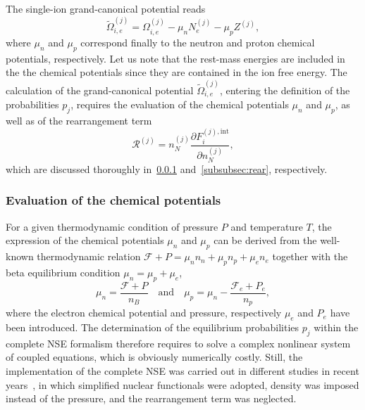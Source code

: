 %
The single-ion grand-canonical potential reads
%
\begin{equation}
  \tilde{\Omega}_{i,e}^{(j)} = \Omega_{i,e}^{(j)} - \mu_n N_e^{(j)} -
  \mu_p Z^{(j)},
\end{equation}
%
where $\mu_n$ and $\mu_p$ correspond finally to the neutron and proton 
chemical potentials, respectively. Let us note that the rest-mass energies are 
included in the the chemical potentials since they are contained in the ion 
free energy. 
The calculation of the grand-canonical potential $\tilde{\Omega}_{i,e}^{(j)}$, 
entering the definition of the probabilities $p_j$, requires the 
evaluation of the chemical potentials $\mu_n$ and $\mu_p$, as well as of the 
rearrangement term
%
\begin{equation}
  \mathcal{R}^{(j)} = n_N^{(j)} 
  \frac{\partial F_i^{(j),\text{int}}}{\partial n_N^{(j)}},
\end{equation}
%
which are discussed thoroughly in~\ref{subsubsec:chempoteval}
and~\ref{subsubsec:rear}, respectively.

\subsubsection{Evaluation of the chemical
potentials}\label{subsubsec:chempoteval}

For a given thermodynamic condition of pressure $P$ and temperature $T$, the
expression of the chemical potentials $\mu_n$ and $\mu_p$ can be derived from 
the well-known thermodynamic relation $\mathcal{F} + P = \mu_n n_n + \mu_p n_p 
+ \mu_e n_e$ together with the beta equilibrium condition $\mu_n = \mu_p + 
\mu_e$,
%
\begin{equation}
  \mu_n = \frac{\mathcal{F} + P}{n_B} \quad \text{and} \quad
  \mu_p = \mu_n - \frac{\mathcal{F}_e + P_e}{n_p},\label{eq:munmup}
\end{equation}
%
where the electron chemical potential and pressure, respectively $\mu_e$ and
$P_e$ have been introduced.
The determination of the equilibrium probabilities $p_j$ within the complete 
NSE formalism therefore requires to solve a complex nonlinear system of coupled 
equations, which is obviously numerically costly. Still, the implementation of 
the complete NSE was carried out in different studies in recent
years~\cite{Oertel2017,Burgio2018}, in which simplified nuclear functionals 
were adopted, density was imposed instead of the pressure, and the 
rearrangement term was neglected.


